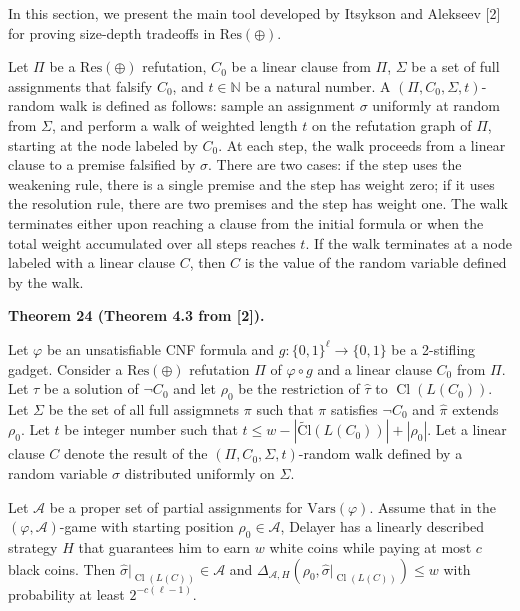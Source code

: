\documentclass[10pt,a4paper]{article}
\begin{document}
In this section, we present the main tool developed by Itsykson and Alekseev [2] for proving size-depth tradeoffs in $\mathrm{Res}(\oplus)$.\par



Let $\Pi$ be a $\mathrm{Res}(\oplus)$ refutation, $C_{0}$ be a linear clause from $\Pi$, $\Sigma$ be a set of full assignments that falsify $C_{0}$, and
$t\in\mathbb{N}$ be a natural number.
A $(\Pi,C_{0},\Sigma,t)$-random walk is defined as follows: sample an assignment $\sigma$ uniformly at random from $\Sigma$,
and perform a walk of weighted length $t$ on the refutation graph of $\Pi$, starting at the node labeled by $C_{0}$.
At each step, the walk proceeds from a linear clause to a premise falsified by $\sigma$.
There are two cases: if the step uses the weakening rule, there is a single premise and the step has weight zero;
if it uses the resolution rule, there are two premises and the step has weight one.
The walk terminates either upon reaching a clause from the initial formula or when the total weight accumulated over all steps reaches $t$.
If the walk terminates at a node labeled with a linear clause $C$, then $C$ is the value of the random variable defined by the walk.\par



\par\medskip\noindent\textbf{
Theorem 24 (Theorem 4.3 from [2]).
}\par



Let $\varphi$ be an unsatisfiable CNF formula and $g\colon\{0,1\}^{\ell}\to\{0,1\}$ be a 2-stifling gadget.
Consider a $\mathrm{Res}(\oplus)$ refutation $\Pi$ of $\varphi\circ g$ and a linear clause $C_{0}$ from $\Pi$.
Let $\tau$ be a solution of $\lnot C_{0}$ and let $\rho_{0}$ be the restriction of $\hat{\tau}$ to $\operatorname{Cl}(L(C_{0}))$.
Let $\Sigma$ be the set of all full assigmnets $\pi$ such that $\pi$ satisfies $\lnot C_{0}$ and $\hat{\pi}$ extends $\rho_{0}$.
Let $t$ be integer number such that $t\leq w-|\operatorname{\widetilde{Cl}}(L(C_{0}))|+|\rho_{0}|$. Let a linear clause $C$ denote the result of the $(\Pi,C_{0},\Sigma,t)$-random walk defined by a random variable $\sigma$ distributed uniformly on $\Sigma$.\par




Let $\mathcal{A}$ be a proper set of partial assignments for $\mathrm{Vars}(\varphi)$.
Assume that in the $(\varphi,\mathcal{A})$-game with starting position $\rho_{0}\in\mathcal{A}$,
Delayer has a linearly described strategy $H$ that guarantees him to earn $w$ white coins while paying at most $c$ black coins.
Then $\hat{\sigma}|_{\operatorname{Cl}(L(C))}\in\mathcal{A}$ and
$\Delta_{\mathcal{A},H}(\rho_{0},\hat{\sigma}|_{\operatorname{Cl}(L(C))})\leq w$ with probability at least $2^{-c(\ell-1)}$.\par
\end{document}
